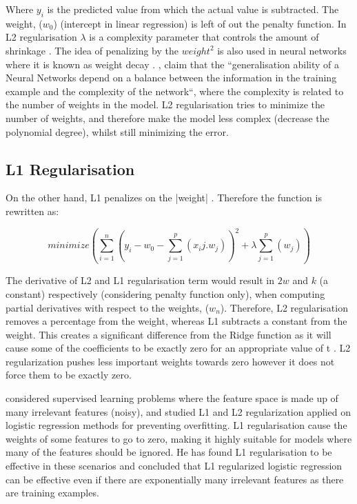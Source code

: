 Where $y_i$ is the predicted value from which the actual value is subtracted. The weight, ($w_0$) (intercept in linear regression) is left of out the penalty function. In L2 regularisation $\lambda$ is a complexity parameter that controls the amount of shrinkage \citep{friedman2001elements}.  The idea of penalizing by the $weight^2$ is also used in neural networks where it is known as weight decay \citep{krogh1992simple,moody1992effective}. \citet{krogh1992simple}, claim that the ``generalisation ability of a Neural Networks depend on a balance between the information in the training example and the complexity of the network``, where the complexity is related to the number of weights in the model. L2 regularisation tries to minimize the number of weights, and therefore make the model less complex (decrease the polynomial degree), whilst still minimizing the error. 


\subsection{L1 Regularisation} 


On the other hand, L1 penalizes on the |weight| \citep{friedman2001elements}. Therefore the function is rewritten as:

\begin{equation}\label{rom_l1}
minimize ( \sum^{n}_{i=1}(y_i - w_0 - \sum^{p}_{j=1}(x_ij.w_j) )^2 + \lambda\sum^{p}_{j=1}(w_j) )
\end{equation}

The derivative of L2 and L1 regularisation term would result in $2w$ and $k$ (a constant) respectively (considering penalty function only), when computing partial derivatives with respect to the weights, ($w_n$). Therefore, L2 regularisation removes a percentage from the weight, whereas L1 subtracts a constant from the weight. This creates a significant difference from the Ridge function as it will cause some of the coefficients to be exactly zero for an appropriate value of t \citep{friedman2001elements}. L2 regularization pushes less important weights towards zero however it does not force them to be exactly zero.

\citet{ng2004feature} considered supervised learning problems where the feature space is made up of many irrelevant features (noisy), and studied L1 and L2 regularization applied on logistic regression methods for preventing overfitting. L1 regularisation cause the weights of some features to go to zero, making it highly suitable for models where many of the features should be ignored. He has found L1 regularisation to be effective in these scenarios and concluded that L1 regularized logistic regression can be effective even if there are exponentially many irrelevant features as there are training examples.


